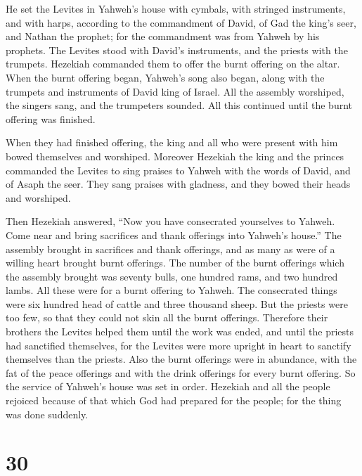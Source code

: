  He set the Levites in Yahweh's house with cymbals, with
stringed instruments, and with harps, according to the commandment of
David, of Gad the king's seer, and Nathan the prophet; for the
commandment was from Yahweh by his prophets.  The Levites
stood with David's instruments, and the priests with the trumpets.
 Hezekiah commanded them to offer the burnt offering on
the altar. When the burnt offering began, Yahweh's song also began,
along with the trumpets and instruments of David king of Israel.
 All the assembly worshiped, the singers sang, and the
trumpeters sounded. All this continued until the burnt offering was
finished.

 When they had finished offering, the king and all who
were present with him bowed themselves and worshiped. 
Moreover Hezekiah the king and the princes commanded the Levites to sing
praises to Yahweh with the words of David, and of Asaph the seer. They
sang praises with gladness, and they bowed their heads and worshiped.

 Then Hezekiah answered, ``Now you have consecrated
yourselves to Yahweh. Come near and bring sacrifices and thank offerings
into Yahweh's house.'' The assembly brought in sacrifices and thank
offerings, and as many as were of a willing heart brought burnt
offerings.  The number of the burnt offerings which the
assembly brought was seventy bulls, one hundred rams, and two hundred
lambs. All these were for a burnt offering to Yahweh. 
The consecrated things were six hundred head of cattle and three
thousand sheep.  But the priests were too few, so that
they could not skin all the burnt offerings. Therefore their brothers
the Levites helped them until the work was ended, and until the priests
had sanctified themselves, for the Levites were more upright in heart to
sanctify themselves than the priests.  Also the burnt
offerings were in abundance, with the fat of the peace offerings and
with the drink offerings for every burnt offering. So the service of
Yahweh's house was set in order.  Hezekiah and all the
people rejoiced because of that which God had prepared for the people;
for the thing was done suddenly.

\hypertarget{section-29}{%
\section{30}\label{section-29}}

